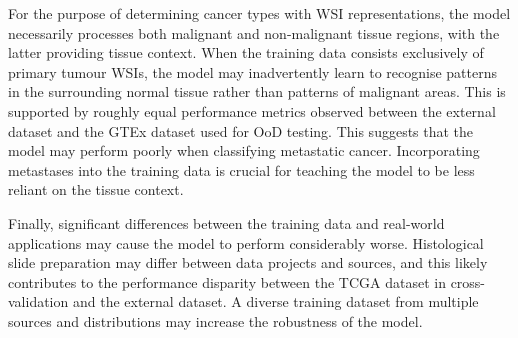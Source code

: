 \documentclass{l4proj}
\begin{document}
For the purpose of determining cancer types with WSI representations, the model necessarily processes both malignant and non-malignant tissue regions, with the latter providing tissue context. When the training data consists exclusively of primary tumour WSIs, the model may inadvertently learn to recognise patterns in the surrounding normal tissue rather than patterns of malignant areas. This is supported by roughly equal performance metrics observed between the external dataset and the GTEx dataset used for OoD testing. This suggests that the model may perform poorly when classifying metastatic cancer. Incorporating metastases into the training data is crucial for teaching the model to be less reliant on the tissue context.

Finally, significant differences between the training data and real-world applications may cause the model to perform considerably worse. Histological slide preparation may differ between data projects and sources, and this likely contributes to the performance disparity between the TCGA dataset in cross-validation and the external dataset. A diverse training dataset from multiple sources and distributions may increase the robustness of the model.
\end{document}
